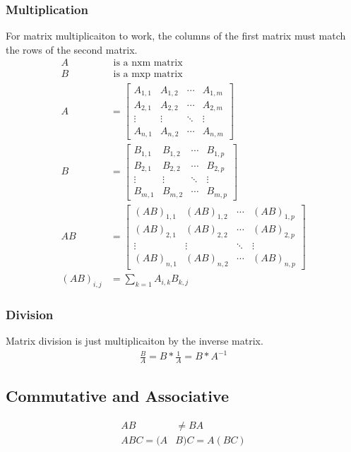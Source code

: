 \documentclass[12pt]{article}
\begin{document}
\subsubsection{Multiplication}
For matrix multiplicaiton to work, the columns of the first matrix must match the rows of the second matrix.
\begin{align}
	A &\text{ is a nxm matrix}\\
	B &\text{ is a mxp matrix}\\
	A &= \left[\begin{array}{cccc}
		A_{1,1} & A_{1,2} & \cdots & A_{1,m} \\ 
		A_{2,1} & A_{2,2} & \cdots & A_{2,m} \\ 
		\vdots & \vdots & \ddots & \vdots \\ 
		A_{n,1} & A_{n,2} & \cdots & A_{n,m}
	\end{array}\right]\\
	B &= \left[\begin{array}{cccc}
		B_{1,1} & B_{1,2} & \cdots & B_{1,p}\\
		B_{2,1} & B_{2,2} & \cdots & B_{2,p}\\
		\vdots & \vdots & \ddots & \vdots \\
		B_{m,1} & B_{m,2} & \cdots & B_{m,p}
	\end{array}\right]\\
	AB &= \left[\begin{array}{cccc}
		(AB)_{1,1} & (AB)_{1,2} & \cdots & (AB)_{1,p}\\
		(AB)_{2,1} & (AB)_{2,2} & \cdots & (AB)_{2,p}\\
		\vdots & \vdots & \ddots & \vdots \\
		(AB)_{n,1} & (AB)_{n,2} & \cdots & (AB)_{n,p}
	\end{array}\right]\\
	(AB)_{i,j} &= \sum_{k=1} A_{i,k} B_{k,j}
\end{align}
\subsubsection{Division}
Matrix division is just multiplicaiton by the inverse matrix.
\begin{align}
	\frac{B}{A} = B * \frac{1}{A} = B * A^{-1}
\end{align}
\subsection{Commutative and Associative}
\begin{align}
	AB &\neq BA\\
	ABC = (A&B)C = A(BC)
\end{align}
\end{document}

